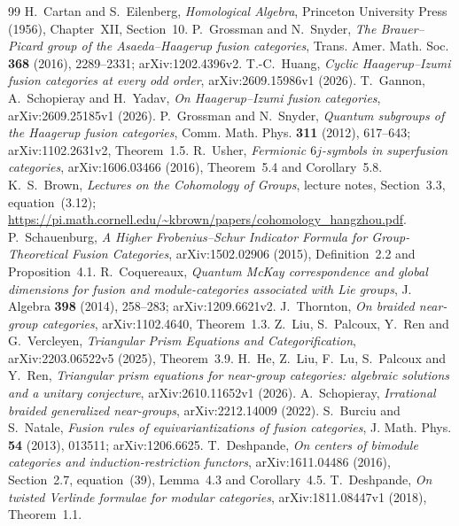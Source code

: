 \documentclass[11pt,reqno]{amsart}
\theoremstyle{definition}
\theoremstyle{remark}
\begin{document}
\begin{thebibliography}{99}
 H.~Cartan and S.~Eilenberg, \emph{Homological Algebra}, Princeton University Press (1956), Chapter~XII, Section~10.
 P.~Grossman and N.~Snyder, \emph{The Brauer--Picard group of the Asaeda--Haagerup fusion categories}, Trans. Amer. Math. Soc. \textbf{368} (2016), 2289--2331; arXiv:1202.4396v2.
 T.-C.~Huang, \emph{Cyclic Haagerup--Izumi fusion categories at every odd order}, arXiv:2609.15986v1 (2026).
 T.~Gannon, A.~Schopieray and H.~Yadav, \emph{On Haagerup--Izumi fusion categories}, arXiv:2609.25185v1 (2026).
 P.~Grossman and N.~Snyder, \emph{Quantum subgroups of the Haagerup fusion categories}, Comm. Math. Phys. \textbf{311} (2012), 617--643; arXiv:1102.2631v2, Theorem~1.5.
 R.~Usher, \emph{Fermionic $6j$-symbols in superfusion categories}, arXiv:1606.03466 (2016), Theorem~5.4 and Corollary~5.8.
 K.~S.~Brown, \emph{Lectures on the Cohomology of Groups}, lecture notes, Section~3.3, equation~(3.12); \url{https://pi.math.cornell.edu/~kbrown/papers/cohomology_hangzhou.pdf}.
 P.~Schauenburg, \emph{A Higher Frobenius--Schur Indicator Formula for Group-Theoretical Fusion Categories}, arXiv:1502.02906 (2015), Definition~2.2 and Proposition~4.1.
 R.~Coquereaux, \emph{Quantum McKay correspondence and global dimensions for fusion and module-categories associated with Lie groups}, J. Algebra \textbf{398} (2014), 258--283; arXiv:1209.6621v2.
 J.~Thornton, \emph{On braided near-group categories}, arXiv:1102.4640, Theorem~1.3.
 Z.~Liu, S.~Palcoux, Y.~Ren and G.~Vercleyen, \emph{Triangular Prism Equations and Categorification}, arXiv:2203.06522v5 (2025), Theorem~3.9.
 H.~He, Z.~Liu, F.~Lu, S.~Palcoux and Y.~Ren, \emph{Triangular prism equations for near-group categories: algebraic solutions and a unitary conjecture}, arXiv:2610.11652v1 (2026).
 A.~Schopieray, \emph{Irrational braided generalized near-groups}, arXiv:2212.14009 (2022).
 S.~Burciu and S.~Natale, \emph{Fusion rules of equivariantizations of fusion categories}, J. Math. Phys. \textbf{54} (2013), 013511; arXiv:1206.6625.
 T.~Deshpande, \emph{On centers of bimodule categories and induction-restriction functors}, arXiv:1611.04486 (2016), Section~2.7, equation~(39), Lemma~4.3 and Corollary~4.5.
 T.~Deshpande, \emph{On twisted Verlinde formulae for modular categories}, arXiv:1811.08447v1 (2018), Theorem~1.1.

\end{thebibliography}
\end{document}
